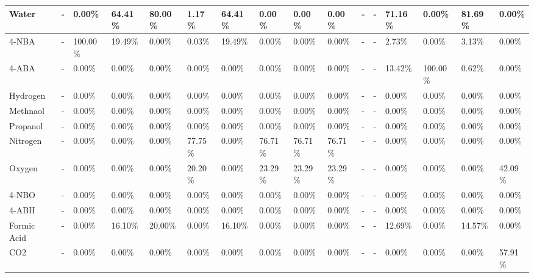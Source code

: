 \begin{landscape}
\begin{table}[H]
\begin{tabular}{|l|l|l|l|l|l|l|l|l|l|l|l|l|l|l|l|}
Water                   & -    & 0.00\%   & 64.41\% & 80.00\% & 1.17\%  & 64.41\% & 0.00\%  & 0.00\%  & 0.00\%  & -    & -    & 71.16\% & 0.00\%   & 81.69\% & 0.00\%  \\ \hline
4-NBA                   & -    & 100.00\% & 19.49\% & 0.00\%  & 0.03\%  & 19.49\% & 0.00\%  & 0.00\%  & 0.00\%  & -    & -    & 2.73\%  & 0.00\%   & 3.13\%  & 0.00\%  \\ \hline
4-ABA                   & -    & 0.00\%   & 0.00\%  & 0.00\%  & 0.00\%  & 0.00\%  & 0.00\%  & 0.00\%  & 0.00\%  & -    & -    & 13.42\% & 100.00\% & 0.62\%  & 0.00\%  \\ \hline
Hydrogen                & -    & 0.00\%   & 0.00\%  & 0.00\%  & 0.00\%  & 0.00\%  & 0.00\%  & 0.00\%  & 0.00\%  & -    & -    & 0.00\%  & 0.00\%   & 0.00\%  & 0.00\%  \\ \hline
Methnaol                & -    & 0.00\%   & 0.00\%  & 0.00\%  & 0.00\%  & 0.00\%  & 0.00\%  & 0.00\%  & 0.00\%  & -    & -    & 0.00\%  & 0.00\%   & 0.00\%  & 0.00\%  \\ \hline
Propanol                & -    & 0.00\%   & 0.00\%  & 0.00\%  & 0.00\%  & 0.00\%  & 0.00\%  & 0.00\%  & 0.00\%  & -    & -    & 0.00\%  & 0.00\%   & 0.00\%  & 0.00\%  \\ \hline
Nitrogen                & -    & 0.00\%   & 0.00\%  & 0.00\%  & 77.75\% & 0.00\%  & 76.71\% & 76.71\% & 76.71\% & -    & -    & 0.00\%  & 0.00\%   & 0.00\%  & 0.00\%  \\ \hline
Oxygen                  & -    & 0.00\%   & 0.00\%  & 0.00\%  & 20.20\% & 0.00\%  & 23.29\% & 23.29\% & 23.29\% & -    & -    & 0.00\%  & 0.00\%   & 0.00\%  & 42.09\% \\ \hline
4-NBO                   & -    & 0.00\%   & 0.00\%  & 0.00\%  & 0.00\%  & 0.00\%  & 0.00\%  & 0.00\%  & 0.00\%  & -    & -    & 0.00\%  & 0.00\%   & 0.00\%  & 0.00\%  \\ \hline
4-ABH                   & -    & 0.00\%   & 0.00\%  & 0.00\%  & 0.00\%  & 0.00\%  & 0.00\%  & 0.00\%  & 0.00\%  & -    & -    & 0.00\%  & 0.00\%   & 0.00\%  & 0.00\%  \\ \hline
Formic Acid             & -    & 0.00\%   & 16.10\% & 20.00\% & 0.00\%  & 16.10\% & 0.00\%  & 0.00\%  & 0.00\%  & -    & -    & 12.69\% & 0.00\%   & 14.57\% & 0.00\%  \\ \hline
CO2                     & -    & 0.00\%   & 0.00\%  & 0.00\%  & 0.00\%  & 0.00\%  & 0.00\%  & 0.00\%  & 0.00\%  & -    & -    & 0.00\%  & 0.00\%   & 0.00\%  & 57.91\% \\ \hline
\end{tabular}
\end{table}



\end{landscape}
